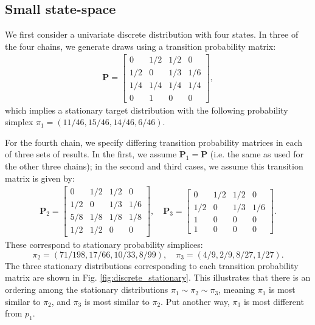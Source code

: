 \documentclass{article}
\begin{document}
\subsection{Small state-space}\label{sec:discrete_small}
We first consider a univariate discrete distribution with four states. In three of the four chains, we generate draws using a transition probability matrix:
%
\begin{gather}
\boldsymbol{P}
=
\begin{bmatrix}
0 & 1/2 & 1/2 & 0\\
1/2 & 0 & 1/3 & 1/6\\
1/4 & 1/4 & 1/4 & 1/4\\
0 & 1 & 0 & 0
\end{bmatrix},
\end{gather}
%
which implies a stationary target distribution with the following probability simplex $\pi_1 = (11/46, 15/46, 14/46, 6/46)$.

For the fourth chain, we specify differing transition probability matrices in each of three sets of results. In the first, we assume $\boldsymbol{P}_1=\boldsymbol{P}$ (i.e. the same as used for the other three chains); in the second and third cases, we assume this transition matrix is given by:
%
\begin{gather}
\boldsymbol{P}_2
=
\begin{bmatrix}
0 & 1/2 & 1/2 & 0\\
1/2 & 0 & 1/3 & 1/6\\
5/8 & 1/8 & 1/8 & 1/8\\
1/2 & 1/2 & 0 & 0
\end{bmatrix},\quad
\boldsymbol{P}_3
=
\begin{bmatrix}
0 & 1/2 & 1/2 & 0\\
1/2 & 0 & 1/3 & 1/6\\
1 & 0 & 0 & 0\\
1 & 0 & 0 & 0
\end{bmatrix}.
\end{gather}
%
These correspond to stationary probability simplices:
%
\begin{equation}
\pi_2 = (71/198, 17/66, 10/33, 8/99), \quad \pi_3 = (4/9, 2/9, 8/27, 1/27).
\end{equation}
%
The three stationary distributions corresponding to each transition probability matrix are shown in Fig. \ref{fig:discrete_stationary}. This illustrates that there is an ordering among the stationary distributions $\pi_1\sim\pi_2\sim\pi_3$, meaning $\pi_1$ is most similar to $\pi_2$, and $\pi_3$ is most similar to $\pi_2$. Put another way, $\pi_3$ is most different from $p_1$.
\end{document}
